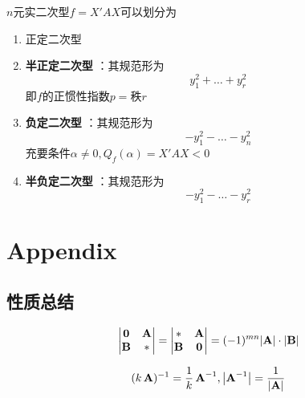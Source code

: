 \documentclass[11pt]{article}
\begin{document}
\(n\)元实二次型\(f=X'AX\)可以划分为
\begin{enumerate}
\item 正定二次型
\item \textbf{半正定二次型} ：其规范形为
\begin{equation*}
y_1^2+\dots+y_r^2
\end{equation*}
即\(f\)的正惯性指数\(p=\)秩\(r\)
\item \textbf{负定二次型} ：其规范形为
\begin{equation*}
-y_1^2-\dots-y_n^2
\end{equation*}
充要条件\(\alpha\neq0,Q_f(\alpha)=X'AX<0\)
\item \textbf{半负定二次型} ：其规范形为
\begin{equation*}
-y_1^2-\dots-y_r^2
\end{equation*}
\end{enumerate}
\section{Appendix}
\label{sec:orgd489e03}
\subsection{性质总结}
\label{sec:org6e6a917}
\begin{equation*}
\begin{vmatrix}
\bzero&\bA\\\bB&*
\end{vmatrix}=
\begin{vmatrix}
*&\bA\\\bB&\bzero
\end{vmatrix}=
(-1)^{mn}\abs{\bA}\cdot\abs{\bB}
\end{equation*}

\begin{equation*}
(k\bA)^{-1}=\frac{1}{k}\bA^{-1},\abs{\bA^{-1}}=\frac{1}{\abs{\bA}}
\end{equation*}
\end{document}
